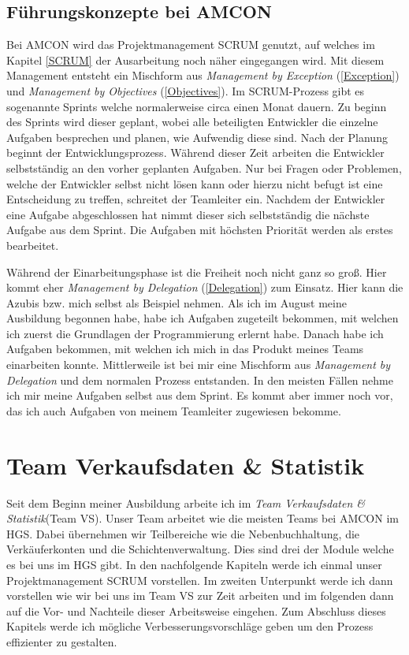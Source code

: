     \subsection{Führungskonzepte bei AMCON} \label{Konzepte AMCON}
        Bei AMCON wird das Projektmanagement SCRUM genutzt, auf welches im Kapitel \ref{SCRUM} der Ausarbeitung noch 
        näher eingegangen wird. Mit diesem Management entsteht ein Mischform aus \emph{Management by Exception} 
        (\ref{Exception}) und \emph{Management by Objectives} (\ref{Objectives}). Im SCRUM-Prozess gibt es sogenannte
        Sprints welche normalerweise circa einen Monat dauern. Zu beginn des Sprints wird dieser geplant, wobei alle 
        beteiligten Entwickler die einzelne Aufgaben besprechen und planen, wie Aufwendig diese sind. Nach der Planung
        beginnt der Entwicklungsprozess. Während dieser Zeit arbeiten die Entwickler selbstständig an den vorher 
        geplanten Aufgaben. Nur bei Fragen oder Problemen, welche der Entwickler selbst nicht lösen kann oder hierzu 
        nicht befugt ist eine Entscheidung zu treffen, schreitet der Teamleiter ein. Nachdem der Entwickler eine Aufgabe 
        abgeschlossen hat nimmt dieser sich selbstständig die nächste Aufgabe aus dem Sprint. Die Aufgaben mit höchsten
        Priorität werden als erstes bearbeitet.

        Während der Einarbeitungsphase ist die Freiheit noch nicht ganz so groß. Hier kommt eher \emph{Management by 
        Delegation} (\ref{Delegation}) zum Einsatz. Hier kann die Azubis bzw. mich selbst als Beispiel nehmen. Als ich
        im August meine Ausbildung begonnen habe, habe ich Aufgaben zugeteilt bekommen, mit welchen ich zuerst die 
        Grundlagen der Programmierung erlernt habe. Danach habe ich Aufgaben bekommen, mit welchen ich mich in das 
        Produkt meines Teams einarbeiten konnte. Mittlerweile ist bei mir eine Mischform aus \emph{Management by 
        Delegation} und dem normalen Prozess entstanden. In den meisten Fällen nehme ich mir meine Aufgaben selbst aus 
        dem Sprint. Es kommt aber immer noch vor, das ich auch Aufgaben von meinem Teamleiter zugewiesen bekomme.

\section{Team Verkaufsdaten \& Statistik} \label{TeamVS}
    Seit dem Beginn meiner Ausbildung arbeite ich im \emph{Team Verkaufsdaten \& Statistik}(Team VS). Unser Team arbeitet wie die
    meisten Teams bei AMCON im HGS. Dabei übernehmen wir Teilbereiche wie die Nebenbuchhaltung, die Verkäuferkonten und 
    die Schichtenverwaltung. Dies sind drei der Module welche es bei uns im HGS gibt. In den nachfolgende Kapiteln werde
    ich einmal unser Projektmanagement SCRUM vorstellen. Im zweiten Unterpunkt werde ich dann vorstellen wie wir bei uns
    im Team VS zur Zeit arbeiten und im folgenden dann auf die Vor- und Nachteile dieser Arbeitsweise eingehen. Zum 
    Abschluss dieses Kapitels werde ich mögliche Verbesserungsvorschläge geben um den Prozess effizienter zu gestalten.

